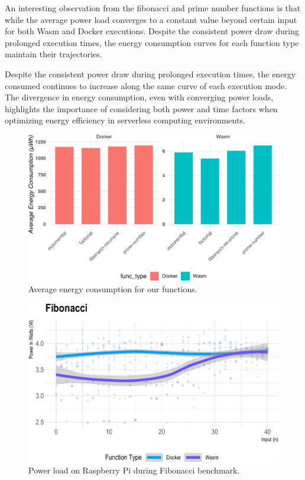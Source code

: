 \documentclass[
  table]{report}
\begin{document}

An interesting observation from the fibonacci and prime number functions
is that while the average power load converges to a constant value
beyond certain input for both \ac{Wasm} and Docker executions. Despite
the consistent power draw during prolonged execution times, the energy
consumption curves for each function type maintain their trajectories.

Despite the consistent power draw during prolonged execution times, the
energy consumed continues to increase along the same curve of each
execution mode. The divergence in energy consumption, even with
converging power loads, highlights the importance of considering both
power and time factors when optimizing energy efficiency in serverless
computing environments.

\begin{figure}[H]

{\centering \includegraphics{thesis_files/figure-latex/avg-energy-consumption-rpi-1} 

}

\caption{Average energy consumption for our functions.}\label{fig:avg-energy-consumption-rpi}
\end{figure}

\begin{figure}[H]

{\centering \includegraphics{thesis_files/figure-latex/fib-power-1} 

}

\caption{Power load on Raspberry Pi during Fibonacci benchmark.}\label{fig:fib-power}
\end{figure}
\end{document}
